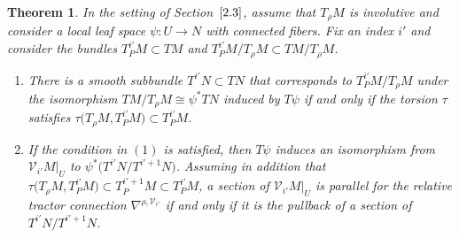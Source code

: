 \documentclass[10pt,a4paper]{amsart}
\numberwithin{equation}{section}
\newtheorem{Theorem}{Theorem}[section]
\def\Cal{\mathcal}
\newcommand{\ps}{\psi}
\begin{document}
\begin{Theorem}\label{thm3.2.2}
In the setting of Section~$\ref{2.3}$, assume that $T_\rho M$ is involutive and consider a
local leaf space $\ps\colon U\to N$ with connected fibers. Fix an index $i'$ and consider
the bundles $T^{i'}_PM\subset TM$ and $T^{i'}_PM/T_\rho M\subset TM/T_\rho M$.
\begin{enumerate}\itemsep=0pt
\item[$(1)$] There is a smooth subbundle $T^{i'}N\subset TN$ that corresponds to
$T^{i'}_PM/T_\rho M$ under the isomorphism $TM/T_\rho M\cong\psi^*TN$ induced by
$T\psi$ if and only if the torsion $\tau$ satisfies $\tau\bigl(T_\rho M,T^{i'}_PM\bigr)\subset
T^{i'}_PM$.

\item[$(2)$] If the condition in $(1)$ is satisfied, then $T\psi$ induces an isomorphism from $\Cal
V_{i'}M|_U$ to $\psi^*\bigl(T^{i'}N/T^{i'+1}N\bigr)$. Assuming in addition that $\tau\bigl(T_\rho
M,T^{i'}_PM\bigr)\subset T^{i'+1}_PM\subset T^{i'}_PM$, a section of $\Cal V_{i'}M|_U$ is
parallel for the relative tractor connection $\nabla^{\rho,\Cal V_{i'}}$ if and only if it
is the pullback of a section of $T^{i'}N/T^{i'+1}N$.
\end{enumerate}
\end{Theorem}
\end{document}
